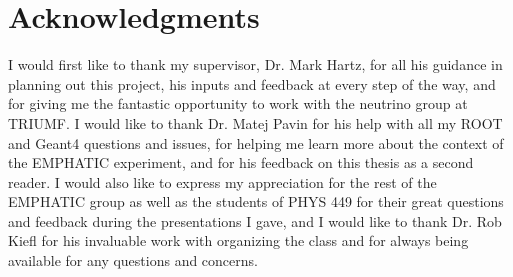 
\chapter{Acknowledgments}
I would first like to thank my supervisor, Dr. Mark Hartz, for all his guidance in planning out this project, his inputs and feedback at every step of the way, and for giving me the fantastic opportunity to work with the neutrino group at TRIUMF. I would like to thank Dr. Matej Pavin for his help with all my ROOT and Geant4 questions and issues, for helping me learn more about the context of the EMPHATIC experiment, and for his feedback on this thesis as a second reader. I would also like to express my appreciation for the rest of the EMPHATIC group as well as the students of PHYS 449 for their great questions and feedback during the presentations I gave, and I would like to thank Dr. Rob Kiefl for his invaluable work with organizing the class and for always being available for any questions and concerns.